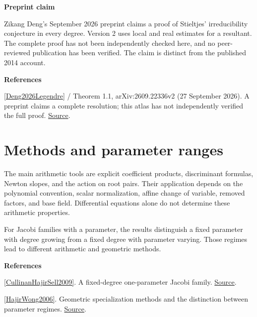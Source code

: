 \documentclass[11pt,a4paper,oneside,openany]{book}
\newenvironment{sources}{\par\smallskip\begingroup\footnotesize\color{atlasgray}\leftskip=10pt\setlength{\parskip}{2pt}}{\par\endgroup\smallskip}
\begin{document}
\begin{atlasblock}[boundary]
\textbf{\sffamily Preprint claim}\par\smallskip
\color{black} Zikang Deng's September 2026 preprint claims a proof of Stieltjes' irreducibility conjecture in every degree. Version 2 uses local and real estimates for a resultant. The complete proof has not been independently checked here, and no peer-reviewed publication has been verified. The claim is distinct from the published 2014 account.\par
\end{atlasblock}\color{black}
\begin{sources}
\textbf{References}\par\smallskip
\noindent\hyperlink{ref:Deng2026Legendre}{[Deng2026Legendre]} / Theorem 1.1, arXiv:2609.22336v2 (27 September 2026). A preprint claims a complete resolution; this atlas has not independently verified the full proof. \href{https://arxiv.org/abs/2609.22336v2}{Source}.\par
\end{sources}\color{black}
\section{Methods and parameter ranges}
\color{black} The main arithmetic tools are explicit coefficient products, discriminant formulas, Newton slopes, and the action on root pairs. Their application depends on the polynomial convention, scalar normalization, affine change of variable, removed factors, and base field. Differential equations alone do not determine these arithmetic properties.\par
\color{black} For Jacobi families with a parameter, the results distinguish a fixed parameter with degree growing from a fixed degree with parameter varying. Those regimes lead to different arithmetic and geometric methods.\par
\begin{sources}
\textbf{References}\par\smallskip
\noindent\hyperlink{ref:CullinanHajirSell2009}{[CullinanHajirSell2009]}. A fixed-degree one-parameter Jacobi family. \href{https://www.numdam.org/articles/10.5802/jtnb.659/}{Source}.\par
\noindent\hyperlink{ref:HajirWong2006}{[HajirWong2006]}. Geometric specialization methods and the distinction between parameter regimes. \href{https://www.numdam.org/item/AIF_2006__56_4_1127_0/}{Source}.\par
\end{sources}\color{black}
\end{document}

